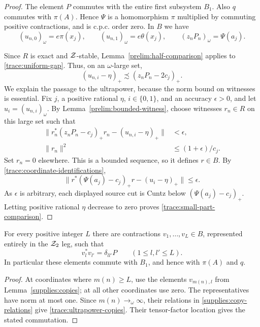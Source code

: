 \begin{proof}
The element $P$ commutes with the entire first subsystem $B_1$.
Also $q$ commutes with $\pi(A)$.  Hence $\Psi$ is a homomorphism
$\pi$ multiplied by commuting positive contractions, and is c.p.c.
order zero.  In $B$ we have
\begin{equation}\label{trace:coordinate-identifications}
 (u_{n,0})_\omega=e\pi(x_j),\qquad
 (u_{n,1})_\omega=e\theta(x_j),\qquad
 (z_nP_n)_\omega=\Psi(a_j).
\end{equation}

Since $R$ is exact and $\mathcal Z$-stable,
Lemma~\ref{prelim:half-comparison} applies to
\eqref{trace:uniform-gap}.  Thus, on an $\omega$-large set,
\[
 (u_{n,i}-\eta)_+
   \precsim(z_nP_n-2c_j)_+.
\]
We explain the passage to the ultrapower, because the norm bound
on witnesses is essential.  Fix $j$, a positive rational $\eta$,
$i\in\{0,1\}$, and an accuracy $\epsilon>0$, and let
$u_i=(u_{n,i})_\omega$.  By
Lemma~\ref{prelim:bounded-witness}, choose witnesses $r_n\in R$
on this large set such that
\[
 \begin{split}
 \bigl\|r_n^*(z_nP_n-c_j)_+r_n-(u_{n,i}-\eta)_+\bigr\|
     &<\epsilon,\\
 \|r_n\|^2&\leq(1+\epsilon)/c_j.
 \end{split}
\]
Set $r_n=0$ elsewhere.  This is a bounded sequence, so it defines
$r\in B$.  By \eqref{trace:coordinate-identifications},
\[
 \bigl\|r^*(\Psi(a_j)-c_j)_+r
       -(u_i-\eta)_+\bigr\|\leq\epsilon.
\]
As $\epsilon$ is arbitrary, each displayed source cut is Cuntz
below $(\Psi(a_j)-c_j)_+$.  Letting positive rational $\eta$
decrease to zero proves \eqref{trace:small-part-comparison}.
\end{proof}

\begin{lemma}\label{trace:copies}
For every positive integer $L$ there are contractions
$v_1,\ldots,v_L\in B$, represented entirely in the $\mathcal Z_2$ leg,
such that
\begin{equation}\label{trace:ultrapower-copies}
 v_l^*v_{l'}=\delta_{ll'}P\qquad(1\leq l,l'\leq L).
\end{equation}
In particular these elements commute with $B_1$, and hence with
$\pi(A)$ and $q$.
\end{lemma}

\begin{proof}
At coordinates where $m(n)\geq L$, use the elements
$v_{m(n),l}$ from Lemma~\ref{supplies:copies}; at all other
coordinates use zero.  The representatives have norm at most one.
Since $m(n)\to_\omega\infty$, their relations in
\eqref{supplies:copy-relations} give
\eqref{trace:ultrapower-copies}.  Their tensor-factor location gives
the stated commutation.
\end{proof}
